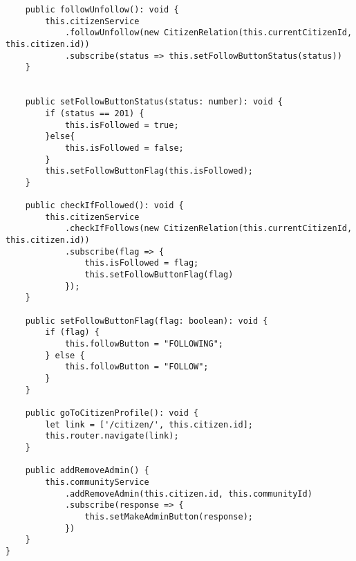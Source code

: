 \begin {lstlisting}
    public followUnfollow(): void {
        this.citizenService
            .followUnfollow(new CitizenRelation(this.currentCitizenId, this.citizen.id))
            .subscribe(status => this.setFollowButtonStatus(status))
    }


    public setFollowButtonStatus(status: number): void {
        if (status == 201) {
            this.isFollowed = true;
        }else{
            this.isFollowed = false;
        }
        this.setFollowButtonFlag(this.isFollowed);
    }

    public checkIfFollowed(): void {
        this.citizenService
            .checkIfFollows(new CitizenRelation(this.currentCitizenId, this.citizen.id))
            .subscribe(flag => {
                this.isFollowed = flag;
                this.setFollowButtonFlag(flag)
            });
    }

    public setFollowButtonFlag(flag: boolean): void {
        if (flag) {
            this.followButton = "FOLLOWING";
        } else {
            this.followButton = "FOLLOW";
        }
    }

    public goToCitizenProfile(): void {
        let link = ['/citizen/', this.citizen.id];
        this.router.navigate(link);
    }

    public addRemoveAdmin() {
        this.communityService
            .addRemoveAdmin(this.citizen.id, this.communityId)
            .subscribe(response => {
                this.setMakeAdminButton(response);
            })
    }
} 
\end{lstlisting}

